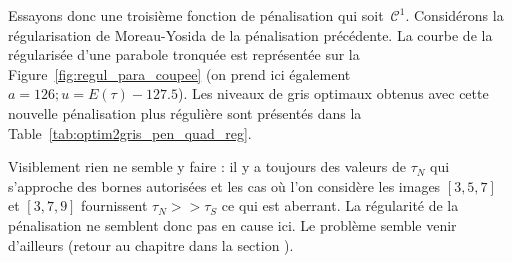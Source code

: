 \documentclass[main.tex]{subfiles}
\begin{document}

Essayons donc une troisième fonction de pénalisation qui soit~$\mathcal{C}^1$. Considérons la régularisation de Moreau-Yosida de la pénalisation précédente. La courbe de la régularisée d'une parabole tronquée est représentée sur la Figure~\ref{fig:regul_para_coupee} (on prend ici également $a=126; u=E(\tau)-127.5$). Les niveaux de gris optimaux obtenus avec cette nouvelle pénalisation plus régulière sont présentés dans la Table~\ref{tab:optim2gris_pen_quad_reg}.


Visiblement rien ne semble y faire : il y a toujours des valeurs de $\tau_N$ qui s'approche des bornes autorisées et les cas où l'on considère les images $[3,5,7]$ et $[3,7,9]$ fournissent $\tau_N >> \tau_S$ ce qui est aberrant.
La régularité de la pénalisation ne semblent donc pas en cause ici. Le problème semble venir d'ailleurs (\cf retour au chapitre dans la section   ).

\end{document}
